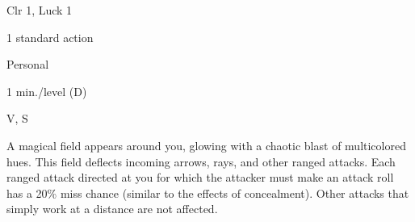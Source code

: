 
\begin{description*}
\item[Level:] Clr 1, Luck 1
\item[Casting Time:] 1 standard action
\item[Range:] Personal
\item[Duration:] 1 min./level (D)
\item[Components:] V, S
\end{description*}

A magical field appears around you, glowing with a chaotic blast of multicolored
hues. This field deflects incoming arrows, rays, and other ranged attacks. Each
ranged attack directed at you for which the attacker must make an attack roll has
a 20\% miss chance (similar to the effects of concealment). Other attacks that
simply work at a distance are not affected.